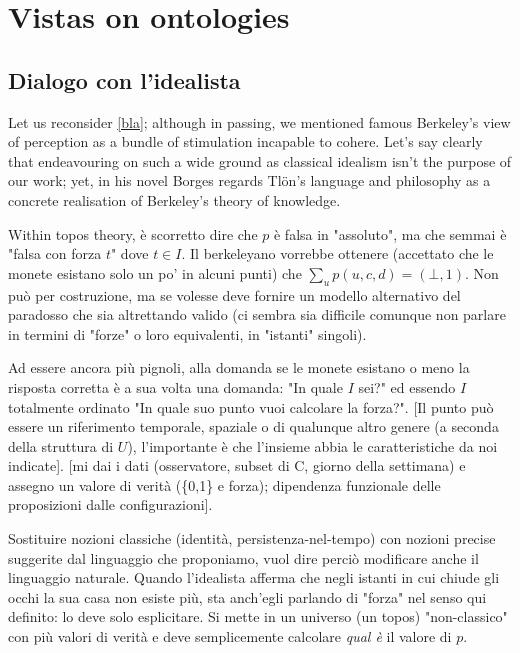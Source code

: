 \section{Vistas on ontologies}

\subsection{Dialogo con l'idealista} 
Let us reconsider \autoref{bla}; although in passing, we mentioned famous Berkeley's view of perception as a bundle of stimulation incapable to cohere. Let's say clearly that endeavouring on such a wide ground as classical idealism isn't the purpose of our work; yet, in his novel Borges regards Tl\"on's language and philosophy as a concrete realisation of Berkeley's theory of knowledge. %

Within topos theory, è scorretto dire che $p$ è falsa in "assoluto", ma che semmai è "falsa con forza $t$" dove $t \in I$. Il berkeleyano vorrebbe ottenere (accettato che le monete esistano solo un po' in alcuni punti) che $\sum_u p(u,c,d) = (\bot,1)$. Non può per costruzione, ma se volesse deve fornire un modello alternativo del paradosso che sia altrettando valido (ci sembra sia difficile comunque non parlare in termini di "forze" o loro equivalenti, in "istanti" singoli).  

Ad essere ancora più pignoli, alla domanda se le monete esistano o meno la risposta corretta è a sua volta una domanda: "In quale $I$ sei?" ed essendo $I$ totalmente ordinato "In quale suo punto vuoi calcolare la forza?". [Il punto può essere un riferimento temporale, spaziale o di qualunque altro genere (a seconda della struttura di $U$), l'importante è che l'insieme abbia le caratteristiche da noi indicate]. [mi dai i dati (osservatore, subset di C, giorno della settimana) e assegno un valore di verità (\{0,1\} e forza); dipendenza funzionale delle proposizioni dalle configurazioni]. 

Sostituire nozioni classiche (identità, persistenza-nel-tempo) con nozioni precise suggerite dal linguaggio che proponiamo, vuol dire perciò modificare anche il linguaggio naturale. Quando l'idealista afferma che negli istanti in cui chiude gli occhi la sua casa non esiste più, sta anch'egli parlando di "forza" nel senso qui definito: lo deve solo esplicitare. Si mette in un universo (un topos) "non-classico" con più valori di verità e deve semplicemente calcolare \emph{qual è} il valore di $p$. 

